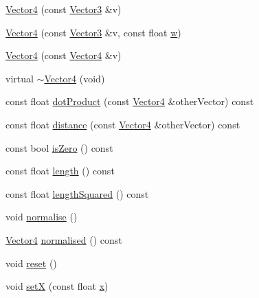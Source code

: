\begin{DoxyCompactItemize}
\item 
\hyperlink{classprism_1_1geometry_1_1_vector4_aae9f77605206216fdf01e16796191124}{Vector4} (const \hyperlink{classprism_1_1geometry_1_1_vector3}{Vector3} \&v)
\item 
\hyperlink{classprism_1_1geometry_1_1_vector4_a2734d895426f188a459180c906c5c693}{Vector4} (const \hyperlink{classprism_1_1geometry_1_1_vector3}{Vector3} \&v, const float \hyperlink{classprism_1_1geometry_1_1_vector4_ad73085ed28fd83da5aa68c6383d94f05}{w})
\item 
\hyperlink{classprism_1_1geometry_1_1_vector4_a62ca47e4f064b489c4a3de99559c1f59}{Vector4} (const \hyperlink{classprism_1_1geometry_1_1_vector4}{Vector4} \&v)
\item 
virtual \hyperlink{classprism_1_1geometry_1_1_vector4_acad8f507c7119e61cfb80d691c5f5ad0}{$\sim$\+Vector4} (void)
\item 
const float \hyperlink{classprism_1_1geometry_1_1_vector4_a30b25520debeebb34a8506be02cd3e71}{dot\+Product} (const \hyperlink{classprism_1_1geometry_1_1_vector4}{Vector4} \&other\+Vector) const 
\item 
const float \hyperlink{classprism_1_1geometry_1_1_vector4_a5997937154252536cca34cb637814f8d}{distance} (const \hyperlink{classprism_1_1geometry_1_1_vector4}{Vector4} \&other\+Vector) const 
\item 
const bool \hyperlink{classprism_1_1geometry_1_1_vector4_a048b75f9194141cf64ab4e6db3cdc6a0}{is\+Zero} () const 
\item 
const float \hyperlink{classprism_1_1geometry_1_1_vector4_a45aa9d0e8ee8b2e303878e6a7c7e7115}{length} () const 
\item 
const float \hyperlink{classprism_1_1geometry_1_1_vector4_a4725052d2fceacc3c08a19f7c4b546a0}{length\+Squared} () const 
\item 
void \hyperlink{classprism_1_1geometry_1_1_vector4_ae76524c2a822aa2e89bba9fda2e7f317}{normalise} ()
\item 
\hyperlink{classprism_1_1geometry_1_1_vector4}{Vector4} \hyperlink{classprism_1_1geometry_1_1_vector4_a094baf99c07654d7a15d2aa92c2c6c49}{normalised} () const 
\item 
void \hyperlink{classprism_1_1geometry_1_1_vector4_a8022284e6c3c6b73c4d562cd595a7c21}{reset} ()
\item 
void \hyperlink{classprism_1_1geometry_1_1_vector4_ae215e01c6c8544149b6027e5181d8e1b}{setX} (const float \hyperlink{classprism_1_1geometry_1_1_vector4_ac97118cafe75aaba4749b32f40bbf566}{x})
\item 

\end{DoxyCompactItemize}
